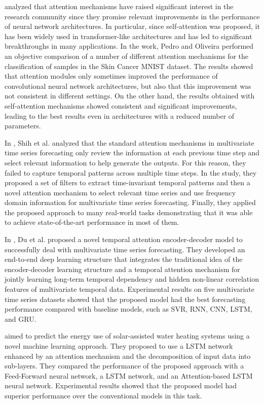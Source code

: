 \cite{9892274} analyzed that attention mechanisms have raised significant interest in the research community since they promise relevant improvements in the performance of neural network architectures.
In particular, since self-attention was proposed, it has been widely used in transformer-like architectures and has led to significant breakthroughs in many applications.
In the work, Pedro and Oliveira performed an objective comparison of a number of different attention mechanisms for the classification of samples in the Skin Cancer MNIST dataset.
The results showed that attention modules only sometimes improved the performance of convolutional neural network architectures, but also that this improvement was not consistent in different settings.
On the other hand, the results obtained with self-attention mechanisms showed consistent and significant improvements, leading to the best results even in architectures with a reduced number of parameters.

In \cite{Shih2019}, Shih et al. analyzed that the standard attention mechanisms in multivariate time series forecasting only review the information at each previous time step and select relevant information to help generate the outputs.
For this reason, they failed to capture temporal patterns across multiple time steps.
In the study, they proposed a set of filters to extract time-invariant temporal patterns and then a novel attention mechanism to select relevant time series and use frequency domain information for multivariate time series forecasting.
Finally, they applied the proposed approach to many real-world tasks demonstrating that it was able to achieve state-of-the-art performance in most of them.

In \cite{DU2020269}, Du et al. proposed a novel temporal attention encoder-decoder model to successfully deal with multivariate time series forecasting.
They developed an end-to-end deep learning structure that integrates the traditional idea of the encoder-decoder learning structure and a temporal attention mechanism for jointly learning long-term temporal dependency and hidden non-linear correlation features of multivariate temporal data.
Experimental results on five multivariate time series datasets showed that the proposed model had the best forecasting performance compared with baseline models, such as SVR, RNN, CNN, LSTM, and GRU.

\cite{HEIDARI2020626} aimed to predict the energy use of solar-assisted water heating systems using a novel machine learning approach.
They proposed to use a LSTM network enhanced by an attention mechanism and the decomposition of input data into sub-layers.
They compared the performance of the proposed approach with a Feed-Forward neural network, a LSTM network, and an Attention-based LSTM neural network.
Experimental results showed that the proposed model had superior performance over the conventional models in this task.

